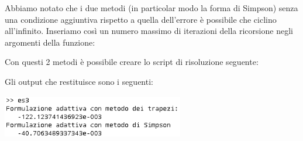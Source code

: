 \begin{flushleft}
Abbiamo notato che i due metodi (in particolar modo la forma di Simpson) senza una condizione aggiuntiva rispetto a quella dell'errore è possibile che ciclino all'infinito. Inseriamo così un numero massimo di iterazioni della ricorsione negli argomenti della funzione:


Con questi 2 metodi è possibile creare lo script di risoluzione seguente:

Gli output che restituisce sono i seguenti:
\includegraphics[left, width=300px, height=100px]{cap_5/es3/es53.png}
\end{flushleft}
